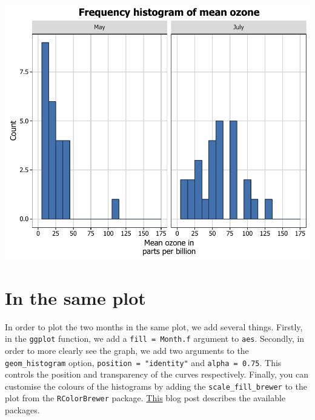 \begin{Shaded}
\begin{Highlighting}[]
     \NormalTok{, }
     \NormalTok{(),}
     \NormalTok{(} \NormalTok{), }
     \NormalTok{(), }
     \NormalTok{(), } \NormalTok{(),}
     \NormalTok{(} \NormalTok{, } \NormalTok{, } \NormalTok{),}
    \NormalTok{(}\NormalTok{)) }
\end{Highlighting}
\end{Shaded}

\begin{center}\includegraphics[width=0.6\linewidth]{7_Histograms_pdf/histogram_19-1} \end{center}

\section{In the same plot}\label{in-the-same-plot}

In order to plot the two months in the same plot, we add several things.
Firstly, in the \texttt{ggplot} function, we add a
\texttt{fill\ =\ Month.f} argument to \texttt{aes}. Secondly, in order
to more clearly see the graph, we add two arguments to the
\texttt{geom\_histogram} option, \texttt{position\ =\ "identity"} and
\texttt{alpha\ =\ 0.75}. This controls the position and transparency of
the curves respectively. Finally, you can customise the colours of the
histograms by adding the \texttt{scale\_fill\_brewer} to the plot from
the \texttt{RColorBrewer} package.
\href{http://moderndata.plot.ly/create-colorful-graphs-in-r-with-rcolorbrewer-and-plotly/}{This}
blog post describes the available packages.

